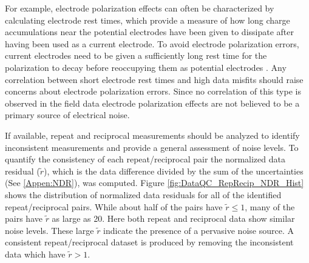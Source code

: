\documentclass[final,authoryear,5p,times,twocolumn]{elsarticle}
\begin{document}
For example, electrode polarization effects can often be characterized by calculating electrode rest times, which provide a measure of how long charge accumulations near the potential electrodes have been given to dissipate after having been used as a current electrode. To avoid electrode polarization errors, current electrodes need to be given a sufficiently long rest time for the polarization to decay before reoccupying them as potential electrodes \citep{Dahlin2000,Merriam2005,Wilkinson2012}. Any correlation between short electrode rest times and high data misfits should raise concerns about electrode polarization errors. Since no correlation of this type is observed in the field data electrode polarization effects are not believed to be a primary source of electrical noise.     

If available, repeat and reciprocal measurements should be analyzed to identify inconsistent measurements and provide a general assessment of noise levels. To quantify the consistency of each repeat/reciprocal pair the normalized data residual ($\tilde{r}$), which is the data difference divided by the sum of the uncertainties (See \ref{Appen:NDR}), was computed. Figure \ref{fig:DataQC_RepRecip_NDR_Hist} shows the distribution of normalized data residuals for all of the identified repeat/reciprocal pairs. While about half of the pairs have $\tilde{r} \leq 1$, many of the pairs have $\tilde{r}$ as large as 20. Here both repeat and reciprocal data show similar noise levels. These large $\tilde{r}$ indicate the presence of a pervasive noise source. A consistent repeat/reciprocal dataset is produced by removing the inconsistent data which have $\tilde{r} > 1$. 
\end{document}
